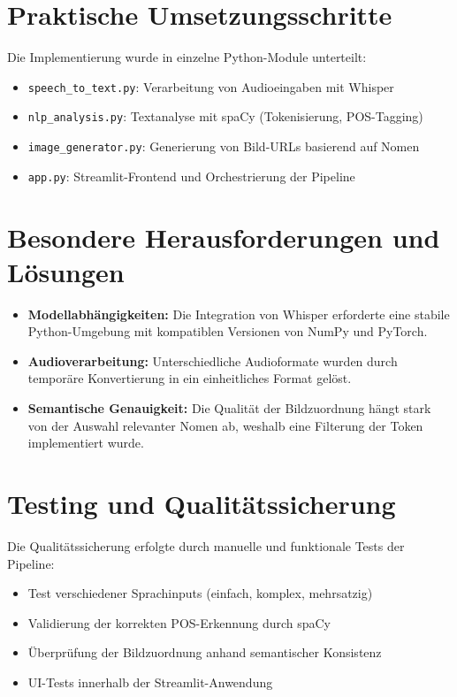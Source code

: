 \section{Praktische Umsetzungsschritte}
Die Implementierung wurde in einzelne Python-Module unterteilt:

\begin{itemize}
    \item \texttt{speech\_to\_text.py}: Verarbeitung von Audioeingaben mit Whisper
    \item \texttt{nlp\_analysis.py}: Textanalyse mit spaCy (Tokenisierung, POS-Tagging)
    \item \texttt{image\_generator.py}: Generierung von Bild-URLs basierend auf Nomen
    \item \texttt{app.py}: Streamlit-Frontend und Orchestrierung der Pipeline
\end{itemize}

\section{Besondere Herausforderungen und Lösungen}

\begin{itemize}
    \item \textbf{Modellabhängigkeiten:} Die Integration von Whisper erforderte eine stabile Python-Umgebung mit kompatiblen Versionen von NumPy und PyTorch.
    
    \item \textbf{Audioverarbeitung:} Unterschiedliche Audioformate wurden durch temporäre Konvertierung in ein einheitliches Format gelöst.
    
    \item \textbf{Semantische Genauigkeit:} Die Qualität der Bildzuordnung hängt stark von der Auswahl relevanter Nomen ab, weshalb eine Filterung der Token implementiert wurde.
\end{itemize}

\section{Testing und Qualitätssicherung}
Die Qualitätssicherung erfolgte durch manuelle und funktionale Tests der Pipeline:

\begin{itemize}
    \item Test verschiedener Sprachinputs (einfach, komplex, mehrsatzig)
    \item Validierung der korrekten POS-Erkennung durch spaCy
    \item Überprüfung der Bildzuordnung anhand semantischer Konsistenz
    \item UI-Tests innerhalb der Streamlit-Anwendung
\end{itemize}

